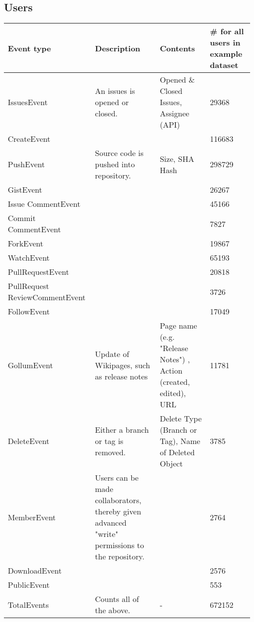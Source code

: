 \documentclass[a4paper,10pt]{article}
\begin{document}
\subsection{Users}
\begin{center}
 
\begin{tabular}{|p{2.5cm}|p{5cm}|p{6cm}|p{2cm}|}\hline
\textbf{Event type} & \textbf{Description}&  \textbf{Contents}& \textbf{\#  for all users in example dataset} \\\hline
 IssuesEvent  & An issues is opened or closed.   &  Opened \& Closed Issues, Assignee (API) &29368\\\hline
CreateEvent    &    & &  116683\\\hline
PushEvent  & Source code is pushed into repository. &  Size, SHA Hash &  298729\\\hline
GistEvent   &    &   &  26267\\\hline
Issue
CommentEvent &    &    &   45166\\\hline
Commit
CommentEvent &    &    &  7827\\\hline
ForkEvent   &    &    & 19867\\\hline
WatchEvent  &  &    &   65193\\\hline
PullRequestEvent     &    &  &  20818\\\hline
PullRequest
ReviewCommentEvent  & && 3726\\\hline
FollowEvent   &    &  & 17049\\\hline
GollumEvent  &  Update of Wikipages, such as release notes& Page name (e.g. "Release Notes") , Action (created, edited), URL  &  11781\\\hline
DeleteEvent   & Either a branch or tag is removed.   &  Delete Type (Branch or Tag), Name of Deleted Object&   3785\\\hline
MemberEvent   & Users can be made collaborators, thereby given advanced "write" permissions to the repository.   & &    2764\\\hline
DownloadEvent  &    & & 2576\\\hline
PublicEvent &  &    &  553\\\hline
TotalEvents & Counts all of the above. & - & 672152 \\\hline
\end{tabular}
\end{center}
\end{document}
